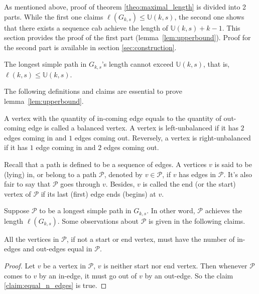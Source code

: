 As mentioned above, proof of theorem \ref{theo:maximal_length} is divided into 2 parts. While the first one claims $\ell(G_{k,s})\leq\mathbb{U}(k,s)$, the second one shows that there exists a sequence cab achieve the length of $\mathbb{U}(k,s)+k-1$. This section provides the proof of the first part (lemma~\ref{lem:upperbound}). Proof for the second part is available in section \ref{sec:construction}. 
    
\begin{lemma}\label{lem:upperbound}
    The longest simple path in $G_{k,s}$'s length cannot exceed $\mathbb{U}(k,s)$, that is, $\ell(k,s)\leq\mathbb{U}(k,s)$.
\end{lemma}
    The following definitions and claims are essential to prove lemma~\ref{lem:upperbound}.  
    
\begin{definition}
    A vertex with the quantity of in-coming edge equals to the quantity of out-coming edge is called a balanced vertex. A vertex is left-unbalanced if it has $2$ edges coming in and $1$ edges coming out. Reversely, a vertex is right-unbalanced if it has $1$ edge coming in and $2$ edges coming out.
\end{definition}


Recall that a path is defined to be a sequence of edges. A vertices $v$ is said to be (lying) in, or belong to a path $\mathcal{P}$, denoted by $v\in\mathscr{P}$, if $v$ has edges in $\mathcal{P}$. It's also fair to say that $\mathcal{P}$ goes through $v$. Besides, $v$ is called the end (or the start) vertex of $\mathcal{P}$ if its last (first) edge ends (begins) at $v$.

Suppose $\mathscr{P}$ to be a longest simple path in $G_{k,s}$. In other word, $\mathscr{P}$ achieves the length $\ell(G_{k,s})$. Some observations about $\mathscr{P}$ is given in the following claims.
\begin{claim}\label{claim:equal_n_edges}
    All the vertices in $\mathscr{P}$, if not a start or end vertex, must have the number of in-edges and out-edges equal in $\mathscr{P}$.
\end{claim}
\begin{proof}
    Let $v$ be a vertex in $\mathscr{P}$, $v$ is neither start nor end vertex. Then whenever $\mathscr{P}$ comes to $v$ by an in-edge, it must go out of $v$ by an out-edge. So the claim \ref{claim:equal_n_edges} is true.
\end{proof}

